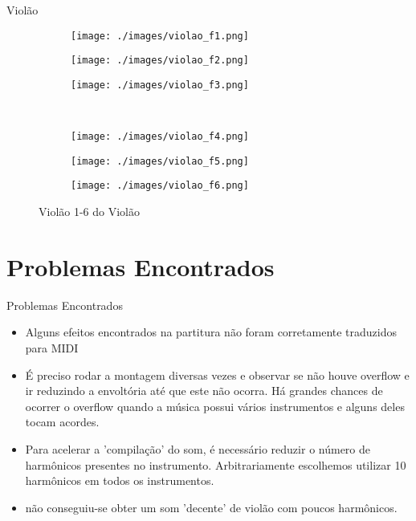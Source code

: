 \documentclass{beamer}
\begin{document}
\begin{frame}{Violão}
\vspace{-1 cm}
\begin{figure}[htp]
  \begin{subfigure}[b]{.15\linewidth}
    \caption*{}
    \texttt{[image: ./images/violao\_f1.png]}
  \end{subfigure}
  \hspace{2 cm}
  \begin{subfigure}[b]{.15\linewidth}
    \caption*{} 
    \texttt{[image: ./images/violao\_f2.png]}
  \end{subfigure}
\hspace{2 cm}
  \begin{subfigure}[b]{.15\linewidth}
    \caption*{} 
    \texttt{[image: ./images/violao\_f3.png]}
  \end{subfigure}  
  \\ \vspace{-0.5 cm}
  \begin{subfigure}[b]{.15\linewidth}
    \caption*{}
    \texttt{[image: ./images/violao\_f4.png]}
  \end{subfigure}
  \hspace{2 cm}
  \begin{subfigure}[b]{.15\linewidth}
    \caption*{} 
    \texttt{[image: ./images/violao\_f5.png]}
  \end{subfigure}
\hspace{2 cm}
  \begin{subfigure}[b]{.15\linewidth}
    \caption*{} 
    \texttt{[image: ./images/violao\_f6.png]}
  \end{subfigure}  
\caption{Violão 1-6 do Violão}
\end{figure}
\end{frame}


\section{Problemas Encontrados}
\begin{frame}{Problemas Encontrados}
\begin{itemize}
	\item Alguns efeitos encontrados na partitura não foram corretamente traduzidos para MIDI
	\item É preciso rodar a montagem diversas vezes e observar se não houve overflow e ir
	reduzindo a envoltória até que este não ocorra. Há grandes chances de ocorrer o overflow quando a música possui vários instrumentos e alguns deles tocam acordes.
	\item Para acelerar a 'compilação' do som, é necessário reduzir o número de harmônicos presentes no instrumento. Arbitrariamente escolhemos utilizar 10 harmônicos em todos os instrumentos.
	\item não conseguiu-se obter um som 'decente' de violão com poucos harmônicos.
\end{itemize}

\end{frame}
\end{document}
